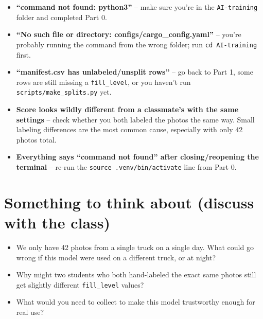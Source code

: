 \documentclass[11pt]{article}
\begin{document}
\begin{warnbox}
\begin{itemize}
  \item \textbf{``command not found: python3''} -- make sure you're in the \texttt{AI-training} folder and completed Part 0.
  \item \textbf{``No such file or directory: configs/cargo\_config.yaml''} -- you're probably running the command from the wrong folder; run \texttt{cd AI-training} first.
  \item \textbf{``manifest.csv has unlabeled/unsplit rows''} -- go back to Part 1, some rows are still missing a \texttt{fill\_level}, or you haven't run \texttt{scripts/make\_splits.py} yet.
  \item \textbf{Score looks wildly different from a classmate's with the same settings} -- check whether you both labeled the photos the same way. Small labeling differences are the most common cause, especially with only 42 photos total.
  \item \textbf{Everything says ``command not found'' after closing/reopening the terminal} -- re-run the \texttt{source .venv/bin/activate} line from Part 0.
\end{itemize}
\end{warnbox}

\section*{Something to think about (discuss with the class)}
\begin{itemize}
  \item We only have 42 photos from a single truck on a single day. What could go wrong if this model were used on a different truck, or at night?
  \item Why might two students who both hand-labeled the exact same photos still get slightly different \texttt{fill\_level} values?
  \item What would you need to collect to make this model trustworthy enough for real use?
\end{itemize}
\end{document}
